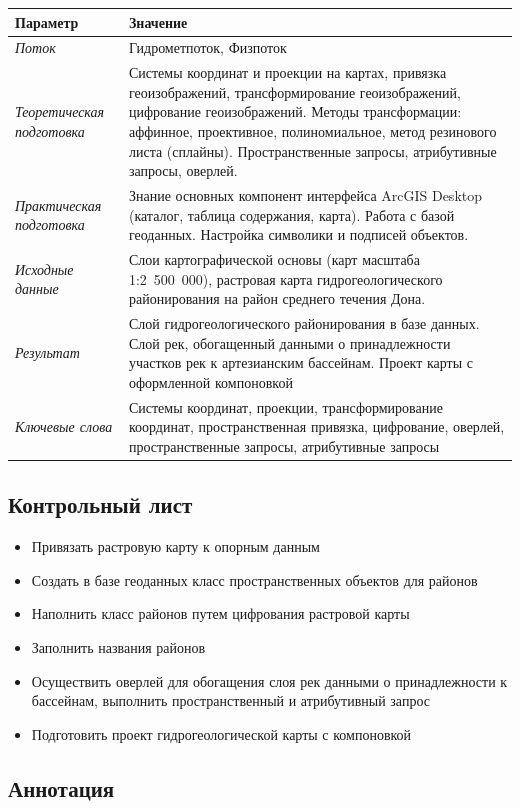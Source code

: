 \documentclass[]{book}
\providecommand{\tightlist}{%
  \setlength{\itemsep}{0pt}\setlength{\parskip}{0pt}}
\theoremstyle{definition}
\theoremstyle{definition}
\theoremstyle{definition}
\theoremstyle{remark}
\begin{document}
\begin{longtable}[]{@{}ll@{}}
\toprule
Параметр & Значение\tabularnewline
\midrule
\endhead
\emph{Поток} & Гидрометпоток, Физпоток\tabularnewline
\emph{Теоретическая подготовка} & Системы координат и проекции на
картах, привязка геоизображений, трансформирование геоизображений,
цифрование геоизображений. Методы трансформации: аффинное, проективное,
полиномиальное, метод резинового листа (сплайны). Пространственные
запросы, атрибутивные запросы, оверлей.\tabularnewline
\emph{Практическая подготовка} & Знание основных компонент интерфейса
ArcGIS Desktop (каталог, таблица содержания, карта). Работа с базой
геоданных. Настройка символики и подписей объектов.\tabularnewline
\emph{Исходные данные} & Слои картографической основы (карт масштаба
1:2~500~000), растровая карта гидрогеологического районирования на район
среднего течения Дона.\tabularnewline
\emph{Результат} & Слой гидрогеологического районирования в базе данных.
Слой рек, обогащенный данными о принадлежности участков рек к
артезианским бассейнам. Проект карты с оформленной
компоновкой\tabularnewline
\emph{Ключевые слова} & Системы координат, проекции, трансформирование
координат, пространственная привязка, цифрование, оверлей,
пространственные запросы, атрибутивные запросы\tabularnewline
\bottomrule
\end{longtable}

\hypertarget{map-ref-hydrogeologic-control}{%
\subsection{Контрольный лист}\label{map-ref-hydrogeologic-control}}

\begin{itemize}
\tightlist
\item
  Привязать растровую карту к опорным данным
\item
  Создать в базе геоданных класс пространственных объектов для районов
\item
  Наполнить класс районов путем цифрования растровой карты
\item
  Заполнить названия районов
\item
  Осуществить оверлей для обогащения слоя рек данными о принадлежности к
  бассейнам, выполнить пространственный и атрибутивный запрос
\item
  Подготовить проект гидрогеологической карты с компоновкой
\end{itemize}

\hypertarget{map-ref-hydrogeologic-annotation}{%
\subsection{Аннотация}\label{map-ref-hydrogeologic-annotation}}
\end{document}
